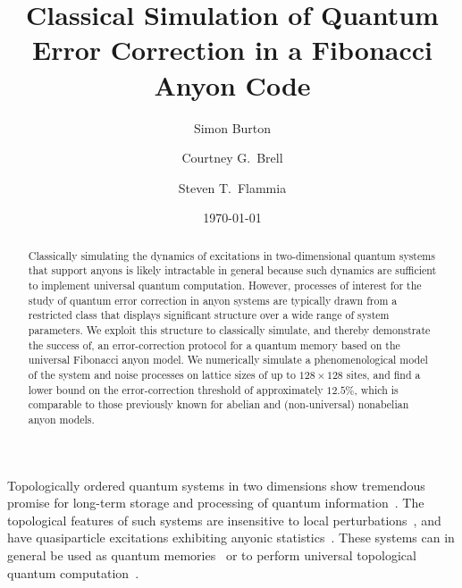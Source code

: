 \documentclass[aps, prl, letterpaper, twocolumn, superscriptaddress, notitlepage, 10pt]{revtex4-1}
\begin{document}
\title{Classical Simulation of Quantum Error Correction in a Fibonacci Anyon Code}

\author{Simon Burton}
\author{Courtney G.\ Brell}
\author{Steven T.\ Flammia}

\date{\today}

\begin{abstract}
Classically simulating the dynamics of excitations in two-dimensional quantum systems that 
support anyons is likely intractable in general because such dynamics are sufficient to implement 
universal quantum computation. However, processes of interest for the study of quantum 
error correction in anyon systems are typically drawn from a restricted class that displays 
significant structure over a wide range of system parameters.
We exploit this structure to classically simulate, and thereby demonstrate the success of, an 
error-correction protocol for a quantum memory based on the universal Fibonacci anyon 
model.  We numerically simulate a phenomenological model of the system and noise 
processes on lattice sizes of up to 
$128\times128$ sites, and find a lower bound on the error-correction threshold of 
approximately $12.5\%$, which is comparable to those previously known for abelian and 
(non-universal) nonabelian anyon models.
\end{abstract}

\maketitle


Topologically ordered quantum systems in two dimensions show tremendous promise for 
long-term storage and processing of quantum information~\cite{Kitaev2003, Dennis2002, Nayak2008}. 
The topological features of such systems are insensitive to local 
perturbations~\cite{Bravyi2010, Bravyi2011a, Michalakis2013}, and have quasiparticle excitations 
exhibiting anyonic statistics~\cite{Wilczek1990}. These systems can in general be used as 
quantum memories~\cite{Kitaev2003, Dennis2002} or to perform universal topological 
quantum computation~\cite{Freedman2002, Nayak2008}.
\end{document}
